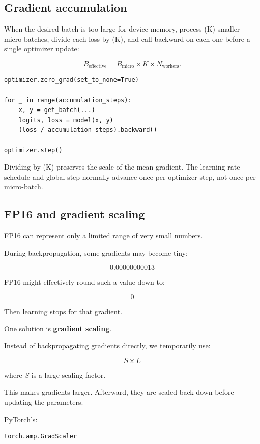\subsection{Gradient accumulation}

When the desired batch is too large for device memory, process (K) smaller
micro-batches, divide each loss by (K), and call backward on each one before
a single optimizer update:

\[
  B_{\text{effective}}
  =B_{\text{micro}}\times K\times N_{\text{workers}}.
\]

\begin{lstlisting}[style=shadedpython]
optimizer.zero_grad(set_to_none=True)

for _ in range(accumulation_steps):
    x, y = get_batch(...)
    logits, loss = model(x, y)
    (loss / accumulation_steps).backward()

optimizer.step()
\end{lstlisting}

Dividing by (K) preserves the scale of the mean gradient. The learning-rate
schedule and global step normally advance once per optimizer step, not once
per micro-batch.

\subsection{FP16 and gradient scaling}

FP16 can represent only a limited range of very small numbers.

During backpropagation, some gradients may become tiny:

\[
  0.00000000013
\]

FP16 might effectively round such a value down to:

\[
  0
\]

Then learning stops for that gradient.

One solution is \textbf{gradient scaling}.

Instead of backpropagating gradients directly, we temporarily use:

\[
  S \times L
\]

where $S$ is a large scaling factor.

This makes gradients larger. Afterward, they are scaled back down before updating the parameters.

PyTorch's:

\begin{lstlisting}[style=shadedpython]
torch.amp.GradScaler
\end{lstlisting}

